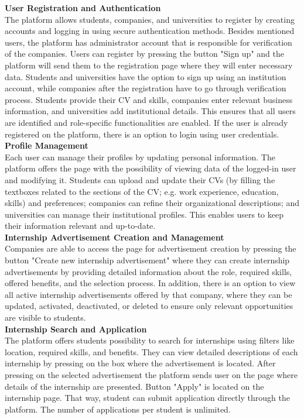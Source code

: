 \quad \textbf{User Registration and Authentication} \\
The platform allows students, companies, and universities to register by creating accounts and logging in using secure authentication methods. Besides mentioned users, the platform has administrator account that is responsible for verification of the companies. Users can register by pressing the button "Sign up" and the platform will send them to the registration page where they will enter necessary data. Students and universities have the option to sign up using an institution account, while companies after the registration have to go through verification process. Students provide their CV and skills, companies enter relevant business information, and universities add institutional details. This ensures that all users are identified and role-specific functionalities are enabled. If the user is already registered on the platform, there is an option to login using user credentials. \\

\textbf{Profile Management} \\
Each user can manage their profiles by updating personal information. The platform offers the page with the possibility of viewing data of the logged-in user and modifying it. Students can upload and update their CVs (by filling the textboxes related to the sections of the CV; e.g. work experience, education, skills) and preferences; companies can refine their organizational descriptions; and universities can manage their institutional profiles. This enables users to keep their information relevant and up-to-date. \\

\textbf{Internship Advertisement Creation and Management} \\
Companies are able to access the page for advertisement creation by pressing the button "Create new internship advertisement" where they can create internship advertisements by providing detailed information about the role, required skills, offered benefits, and the selection process. In addition, there is an option to view all active internship advertisements offered by that company, where they can be updated, activated, deactivated, or deleted to ensure only relevant opportunities are visible to students. \\

\textbf{Internship Search and Application} \\
The platform offers students possibility to search for internships using filters like location, required skills, and benefits. They can view detailed descriptions of each internship by pressing on the box where the advertisement is located. After pressing on the selected advertisement the platform sends user on the page where details of the internship are presented. Button "Apply" is located on the internship page. That way, student can submit application directly through the platform. The number of applications per student is unlimited. \\

